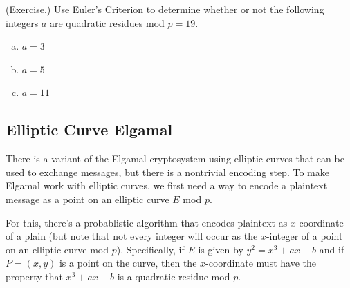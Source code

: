 \documentclass[letterpaper]{article}
\begin{document}
\begin{mdframed}
    (Exercise.) Use Euler's Criterion to determine whether or not the following integers $a$ are quadratic residues mod $p = 19$. 
    \begin{enumerate}[(a)]
        \item $a = 3$
        \begin{mdframed}
            
        \end{mdframed}
        \item $a = 5$
        \begin{mdframed}
            
        \end{mdframed}
        \item $a = 11$
        \begin{mdframed}
            
        \end{mdframed}
    \end{enumerate}
\end{mdframed}


\subsection{Elliptic Curve Elgamal}
There is a variant of the Elgamal cryptosystem using elliptic curves that can be used to exchange messages, but there is a nontrivial encoding step. To make Elgamal work with elliptic curves, we first need a way to encode a plaintext message as a point on an elliptic curve $E$ mod $p$. 

\bigskip 

For this, there's a probablistic algorithm that encodes plaintext as $x$-coordinate of a plain (but note that not every integer will occur as the $x$-integer of a point on an elliptic curve mod $p$). Specifically, if $E$ is given by $y^2 = x^3 + ax + b$ and if $P = (x, y)$ is a point on the curve, then the $x$-coordinate must have the property that $x^3 + ax + b$ is a quadratic residue mod $p$. 
\end{document}
